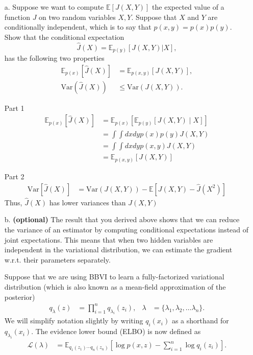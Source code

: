 \documentclass [12pt]{article}
\newcommand{\E}{\ensuremath{\mathbb{E}}}
\begin{document}
\begin{itemize}
\item[a.] Suppose we want to compute $\E\left[ J(X,Y) \right]$ the expected value of a function $J$ on two random variables $X, Y$. Suppose that $X$ and $Y$ are conditionally independent, which is to say that $p(x,y) = p(x)p(y)$. Show that the conditional expectation 
\[
	\hat{J}(X) = \E_{p(y)}\left[ J(X,Y) | X \right],
\]
has the following two properties
\begin{align*}
	\E_{p(x)}\left[ \hat{J}(X)\right] 
    &= \E_{p(x,y)}\left[J(X,Y) \right],
    \\
    \text{Var}(\hat{J}(X)) 
    &\leq \text{Var}(J(X,Y)).
\end{align*}

Part 1
\begin{align*}
   \E_{p(x)}\left[ \hat{J}(X)\right] &= \E_{p(x)}\left[ \E_{p(y)}\left[ J(X, Y )\mid X \right]\right] \\
   &= \int \int dx dy p(x) p(y) J(X,Y) \\
   &= \int \int dx dy p(x, y) J(X,Y) \\
   &= \E_{p(x,y)}\left[J(X,Y) \right]
\end{align*}

Part 2 
\begin{align*}
    \textrm{Var}\left[ \hat{J}(X) \right] &= \textrm{Var}(J(X,Y)) - \E\left[J(X,Y) - \hat{J}(X^2)\right]
\end{align*}
Thus, $\hat{J}(X)$ has lower variances than $J(X,Y)$

\item[b.] \textbf{(optional)} The result that you derived above shows that we can reduce the variance of an estimator by computing conditional expectations instead of joint expectations. This means that when two hidden variables are independent in the variational distribution, we can estimate the gradient w.r.t. their parameters separately.

Suppose that we are using BBVI to learn a fully-factorized variational distribution (which is also known as a mean-field approximation of the posterior) 
\begin{align*} 
	q_{\lambda}(z) 
    &= 
    \prod_{i=1}^{n}q_{\lambda_{i}}(z_{i}),
   &
   \lambda 
   &= 
   \{ 
     \lambda_{1}, \lambda_{2}, \ldots \lambda_{n} 
   \}.
\end{align*}
We will simplify notation slightly by writing $q_{i}(x_i)$ as a shorthand for $q_{\lambda_{i}}(x_i)$. The evidence lower bound (ELBO) is now defined as
\begin{align}
	\mathcal{L}(\lambda)
	&= 
    \E_{q_{1}(z_{1})\cdots q_{n}(z_{n})}
    \left[
    	\log p(x,z) - \sum_{i=1}^{n} \log q_{i}(z_{i}) 
    \right].
\end{align}


\end{itemize}
\end{document}
